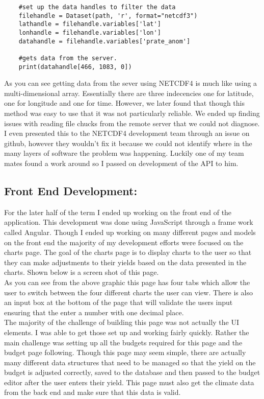 \documentclass[onecolumn, draftclsnofoot,10pt, compsoc]{article}
\begin{document}
\begin{lstlisting}
	#set up the data handles to filter the data
	filehandle = Dataset(path, 'r', format="netcdf3")
	lathandle = filehandle.variables['lat']
	lonhandle = filehandle.variables['lon']
	datahandle = filehandle.variables['prate_anom']

	#gets data from the server.
	print(datahandle[466, 1083, 0])
\end{lstlisting}
		
		As you can see getting data from the sever using NETCDF4 is much like using a multi-dimensional array. Essentially there are three indecencies one for latitude, one for longitude and one for time. However, we later found that though this method was easy to use that it was not particularly reliable. We ended up finding issues with reading file chucks from the remote server that we could not diagnose. I even presented this to the NETCDF4 development team through an issue on github, however they wouldn't fix it because we could not identify where in the many layers of software the problem was happening. Luckily one of my team mates found a work around so I passed on development of the API to him.\\
	
		\subsection{Front End Development:}
		For the later half of the term I ended up working on the front end of the application. This development was done using JavaScript through a frame work called Angular. Though I ended up working on many different pages and models on the front end the majority of my development efforts were focused on the charts page. The goal of the charts page is to display charts to the user so that they can make adjustments to their yields based on the data presented in the charts. Shown below is a screen shot of this page.\\
		
		
	As you can see from the above graphic this page has four tabs which allow the user to switch between the four different charts the user can view. There is also an input box at the bottom of the page that will validate the users input ensuring that the enter a number with one decimal place.\\
	
	The majority of the challenge of building this page was not actually the UI elements. I was able to get those set up and working fairly quickly. Rather the main challenge was setting up all the budgets required for this page and the budget page following. Though this page may seem simple, there are actually many different data structures that need to be managed so that the yield on the budget is adjusted correctly, saved to the database and then passed to the budget editor after the user enters their yield. This page must also get the climate data from the back end and make sure that this data is valid.\\
	
\end{document}
